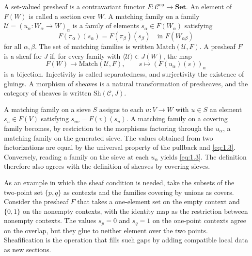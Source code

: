 \begin{definition}\label{def:1.22}

A set-valued presheaf is a contravariant functor
$F:\mathcal{C}^{\mathrm{op}}\to{\mathbf{Set}}$.
An element of $F(W)$ is called a section over $W$.
A matching family on a family $\mathcal{U}=(u_\alpha:W_\alpha\to W)_\alpha$ is a
family of elements $s_\alpha\in F(W_\alpha)$ satisfying
\begin{equation*}
F(\pi_\alpha)(s_\alpha)=F(\pi_\beta)(s_\beta)
\quad\text{in }F(W_{\alpha\beta})
\tag{1.3}\label{eq:1.3}
\end{equation*}
for all $\alpha,\beta$.
The set of matching families is written $\mathrm{Match}(\mathcal{U},F)$.
A presheaf $F$ is a sheaf for $J$ if, for every family with
$\langle \mathcal{U}\rangle\in J(W)$, the map
\begin{equation*}
F(W)\longrightarrow\mathrm{Match}(\mathcal{U},F),
\qquad s\longmapsto(F(u_\alpha)(s))_\alpha
\tag{1.4}\label{eq:1.4}
\end{equation*}
is a bijection. Injectivity is called separatedness, and surjectivity the
existence of gluings.
A morphism of sheaves is a natural transformation of presheaves, and the
category of sheaves is written $\mathrm{Sh}(\mathcal{C},J)$.

A matching family on a sieve $S$ assigns to each $u:V\to W$ with $u\in S$ an
element $s_u\in F(V)$ satisfying $s_{uv}=F(v)(s_u)$.
A matching family on a covering family becomes, by restriction to the morphisms
factoring through the $u_\alpha$, a matching family on the generated sieve.
The values obtained from two factorizations are equal by the universal property
of the pullback and \eqref{eq:1.3}.
Conversely, reading a family on the sieve at each $u_\alpha$ yields
\eqref{eq:1.3}.
The definition therefore also agrees with the definition of sheaves by covering
sieves.

As an example in which the sheaf condition is needed, take the subsets of the
two-point set $\{p,q\}$ as contexts and the families covering by unions as
covers. Consider the presheaf $F$ that takes a one-element set on the empty
context and $\{0,1\}$ on the nonempty contexts, with the identity map as the
restriction between nonempty contexts.
The values $s_p=0$ and $s_q=1$ on the one-point contexts agree on the overlap,
but they glue to neither element over the two points.
Sheafification is the operation that fills such gaps by adding compatible local
data as new sections.

\end{definition}

